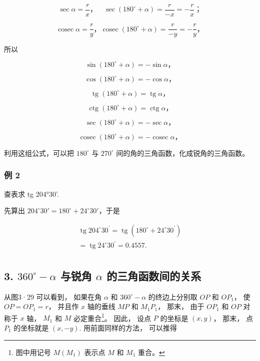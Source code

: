 \[
\sec \alpha = \frac {r}{x}\text{，} \quad \sec (180 ^{\circ} + \alpha) = \frac {r}{- x} = - \frac {r}{x}\text{；}
\]

\[
\operatorname{cosec} \alpha = \frac {r}{y}\text{，} \operatorname{cosec} (180 ^{\circ} + \alpha) = \frac {r}{- y} = - \frac {r}{y}\text{，}
\]

所以

\[
\sin (180 ^{\circ} + \alpha) = - \sin \alpha \text{，}
\]

\[
\cos (180 ^{\circ} + \alpha) = - \cos \alpha \text{，}
\]

\[
\operatorname{tg} (180 ^{\circ} + \alpha) = \operatorname{tg} \alpha \text{，}
\]

\[
\operatorname{ctg} (180 ^{\circ} + \alpha) = \operatorname{ctg} \alpha \text{，}
\]

\[
\sec (180 ^{\circ} + \alpha) = - \sec \alpha \text{，}
\]

\[
\operatorname{cosec} (180 ^{\circ} + \alpha) = - \operatorname{cosec} \alpha \text{，}
\]

利用这组公式，可以把 \(180^{\circ}\) 与 \(270^{\circ}\)
间的角的三角函数，化成锐角的三角函数。

\subsubsection{例 2}

查表求 tg 204°30'.

 先算出
\(204^{\circ}30' = 180^{\circ} + 24^{\circ}30'\)，于是

\[
\begin{array}{l} \operatorname{tg} 204 ^{\circ} 30 ^{\prime} = \operatorname{tg} (180 ^{\circ} + 24 ^{\circ} 30 ^{\prime}) \\ = \operatorname{tg} 24 ^{\circ} 30 ^{\prime} = 0.4557. \\ \end{array}
\]

\subsection{\texorpdfstring{3. \(360^{\circ}-\alpha\) 与锐角 \(\alpha\) 的三角函数间的关系}{3. 360\^{}\{\textbackslash circ\}-\textbackslash alpha 与锐角 \textbackslash alpha 的三角函数间的关系}}\label{circ-alpha-ux4e0eux9510ux89d2-alpha-ux7684ux4e09ux89d2ux51fdux6570ux95f4ux7684ux5173ux7cfb-1}

从图3·29 可以看到， 如果在角 \(\alpha\) 和 \(360^{\circ}-\alpha\)
的终边上分别取 \(OP\) 和 \(OP_{1}\)， 使 \(OP = OP_{1} = r\)， 并且作
\(x\) 轴的垂线 \(MP\) 和 \(M_{1}P_{1}\)， 那末， 由于 \(OP_{1}\) 和
\(OP\) 对称于 \(x\) 轴， \(M_{1}\) 和 \(M\) 必定重合\footnote{图中用记号
  \(M(M_{1})\) 表示点 \(M\) 和 \(M_{1}\) 重合。}。 因此， 设点 \(P\)
的坐标是 \((x, y)\)， 那末， 点 \(P_{1}\) 的坐标就是 \((x, -y)\).
用前面同样的方法， 可以推得

